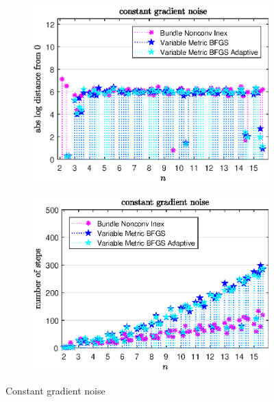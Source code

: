 \begin{figure}[ht]
	\begin{subfigure}{0.49\textwidth}
		\includegraphics[width=\textwidth]{Pictures/Plots/constant_gradient_noise2.eps}%
	\end{subfigure}
	\begin{subfigure}{0.49\textwidth}
		\includegraphics[width=\textwidth]{Pictures/Plots/steps_constant_gradient_noise2.eps}%
	\end{subfigure}
	\caption{Constant gradient noise}%
	\label{fig_const_grad_noise}%
\end{figure}

